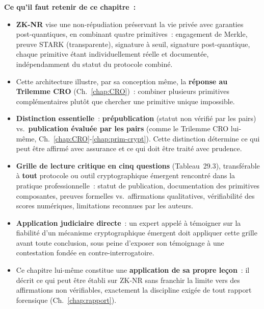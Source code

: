\begin{boxresume}
\textbf{Ce qu'il faut retenir de ce chapitre~:}
\begin{itemize}
    \item \textbf{ZK-NR} vise une non-répudiation préservant la vie
          privée avec garanties post-quantiques, en combinant quatre
          primitives~: engagement de Merkle, preuve STARK
          (transparente), signature à seuil, signature
          post-quantique, chaque primitive étant individuellement
          réelle et documentée, indépendamment du statut du protocole
          combiné.

    \item Cette architecture illustre, par sa conception même, la
          \textbf{réponse au Trilemme CRO} (Ch.~\ref{chap:CRO})~:
          combiner plusieurs primitives complémentaires plutôt que
          chercher une primitive unique impossible.

    \item \textbf{Distinction essentielle}~: \textbf{prépublication}
          (statut non vérifié par les pairs) vs.\ \textbf{publication
          évaluée par les pairs} (comme le Trilemme CRO lui-même,
          Ch.~\ref{chap:CRO}-\ref{chap:prim-crypt}). Cette distinction
          détermine ce qui peut être affirmé avec assurance et ce
          qui doit être traité avec prudence.

    \item \textbf{Grille de lecture critique en cinq questions}
          (Tableau~29.3), transférable à \textbf{tout} protocole
          ou outil cryptographique émergent rencontré dans la
          pratique professionnelle~: statut de publication,
          documentation des primitives composantes, preuves
          formelles vs.\ affirmations qualitatives, vérifiabilité
          des scores numériques, limitations reconnues par les
          auteurs.

    \item \textbf{Application judiciaire directe}~: un expert
          appelé à témoigner sur la fiabilité d'un mécanisme
          cryptographique émergent doit appliquer cette grille
          avant toute conclusion, sous peine d'exposer son
          témoignage à une contestation fondée en
          contre-interrogatoire.

    \item Ce chapitre lui-même constitue une \textbf{application de
          sa propre leçon}~: il décrit ce qui peut être établi sur
          ZK-NR sans franchir la limite vers des affirmations non
          vérifiables, exactement la discipline exigée de tout
          rapport forensique (Ch.~\ref{chap:rapport}).
\end{itemize}
\end{boxresume}

